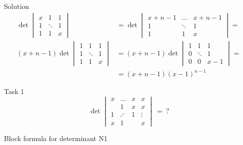 \documentclass[fullscreen=true, bookmarks=true, hyperref={pdfencoding=unicode}]{beamer}
\begin{document}
\begin{frame}{Solution}
  \begin{align*}
    \det \begin{vmatrix}
      x & 1 & 1 \\
      1 & \ddots & 1 \\
      1 & 1 & x
    \end{vmatrix} &= 
        \det \begin{vmatrix}
      x+n-1 & \dots & x+n-1 \\
      1 & \ddots & 1 \\
      1 & 1 & x
    \end{vmatrix} = \\
    (x+n-1) \det \begin{vmatrix}
      1 & 1 & 1 \\
      1 & \ddots & 1 \\
      1 & 1 & x
    \end{vmatrix} &= 
    (x+n-1) \det \begin{vmatrix}
      1 & 1 & 1 \\
      0 & \ddots & 1 \\
      0 & 0 & x-1
    \end{vmatrix} = \\
    &= (x+n-1) (x-1)^{n-1}
  \end{align*}
\end{frame}


\begin{frame}{Task 1}
  $$\det \begin{vmatrix}
    x & \dots & x & x \\
      &   1 &   x &  x \\
    1 & \iddots  & 1   &  \vdots \\
    x & 1 &   &  x
  \end{vmatrix}\ =\ ?$$
\end{frame}


\begin{frame}{Block formula for determinant N1}
  \newcommand{\sidelen}{3cm}
  \newcommand{\shift}{0.25cm}
  \centering
\end{frame}
\end{document}

